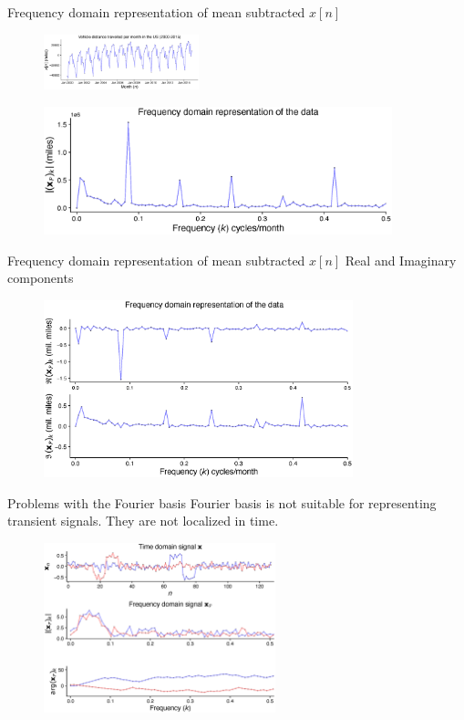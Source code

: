 \documentclass[aspectratio=169]{beamer}
\begin{document}
\begin{frame}[t]{Frequency domain representation of mean subtracted $x[n]$}
  \begin{figure}[h]
    \includegraphics[width=0.4\textwidth]{figs/miles_nomean.eps}
  \end{figure}

  \begin{figure}[h]
    \includegraphics[width=0.9\textwidth]{figs/miles_nomean_fft.eps}
  \end{figure}
\end{frame}


\begin{frame}[t]{Frequency domain representation of mean subtracted $x[n]$}
  Real and Imaginary components
  \begin{figure}[h]
    \includegraphics[width=0.8\textwidth]{figs/miles_nomean_fft_reim.eps}
  \end{figure}
\end{frame}


\begin{frame}[t]{Problems with the Fourier basis}
  Fourier basis is not suitable for representing transient signals. They are not localized in time.
  \begin{figure}[h]
    \includegraphics[width=0.6\textwidth]{figs/signal_transient.eps}
  \end{figure}
\end{frame}
\end{document}
